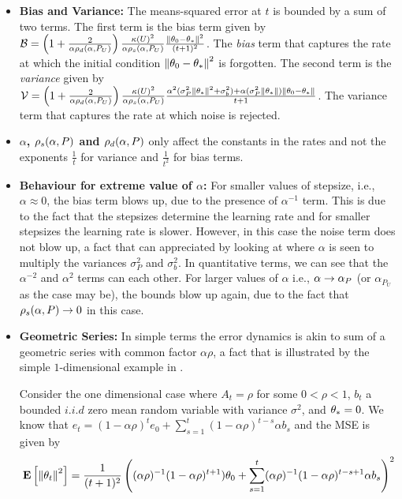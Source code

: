\begin{itemize}[leftmargin=*, before = \leavevmode\vspace{-\baselineskip}]
\item \textbf{Bias and Variance:} The means-squared error at $t$ is bounded by a sum of two terms. The first term is the bias term given by $\mathcal{B}=\left(1+\frac2{\alpha\rho_d(\alpha,P_U)}\right)\frac{\kappa(U)^2}{\alpha \rho_s(\alpha,P_U)}\frac{\left\| \theta_0-\theta_*\right\|^2}{(t+1)^2}$.  The \emph{bias} term that captures the rate at which the initial condition $\left\| \theta_0-\theta_*\right\|^2$ is forgotten. The second term is the \emph{variance} given by $\mathcal{V}=\left(1+\frac2{\alpha\rho_d(\alpha,P_U)}\right)\frac{\kappa(U)^2}{\alpha \rho_s(\alpha,P_U)} \frac{\alpha^2(\sigma_P^2\left\| \theta_*\right\|^2+\sigma_b^2)+\alpha (\sigma_P^2\left\| \theta_*\right\|)\left\| \theta_0-\theta_*\right\|}{t+1} $. The variance term that captures the rate at which noise is rejected.
\item \textbf{$\alpha$, $\rho_s(\alpha,P)$ and $\rho_d(\alpha,P)$} only affect the constants in the rates and not the exponents $\frac{1}{t}$ for variance and $\frac{1}{t^2}$ for bias terms.
\item \textbf{Behaviour for extreme value of $\alpha$:} For smaller values of stepsize, i.e., $\alpha\approx 0$, the bias term blows up, due to the presence of $\alpha^{-1}$ term. This is due to the fact that the stepsizes determine the learning rate and for smaller stepsizes the learning rate is slower. However, in this case the noise term does not blow up, a fact that can appreciated by looking at  where $\alpha$ is seen to multiply the variances $\sigma^2_P$ and $\sigma^2_b$. In quantitative terms, we can see that the $\alpha^{-2}$ and $\alpha^2$ terms can each other. For larger values of $\alpha$ i.e., $\alpha\rightarrow \alpha_{P}$ (or $\alpha_{P_U}$ as the case may be), the bounds blow up again, due to the fact that $\rho_s(\alpha,P)\rightarrow 0$ in this case.
\item \textbf{Geometric Series:} In simple terms the error dynamics is akin to sum of a geometric series with common factor $\alpha\rho$, a fact that is illustrated by the simple $1$-dimensional example in .
\begin{example}\label{ex:geo}
Consider the one dimensional case where $A_t=\rho$ for some $0<\rho<1$, $b_t$ a bounded $i.i.d$ zero mean random variable with variance $\sigma^2$, and $\theta_*=0$. We know that $e_t=(1-\alpha\rho)^t e_0+\sum_{s=1}^t (1-\alpha \rho)^{t-s}\alpha b_s$ and the MSE is given by
\begin{align*}
\EE{\norm{\theta_t}^2}&=\frac{1}{(t+1)^2}\left( (\alpha\rho)^{-1}(1-\alpha\rho)^{t+1}) \theta_0+ \sum_{s=1}^t (\alpha\rho)^{-1}(1-\alpha \rho)^{t-s+1} \alpha b_s\right)^2\\

\end{align*}
\end{example}
\end{itemize}
